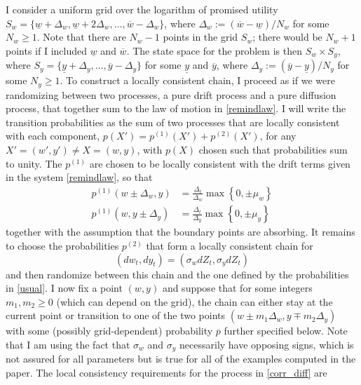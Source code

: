 \documentclass[11pt]{article}
\theoremstyle{plain}
\begin{document}

I consider a uniform grid over the logarithm of promised utility $S_w = \{\underline{w} + \Delta_w, \underline{w} + 2\Delta_w, \dots, \overline{w} - \Delta_w\}$, where $\Delta_w := (\overline{w} - \underline{w})/N_w$ for some $N_w \geq 1$. Note that there are $N_w-1$ points in the grid $S_w$; there would be $N_w+1$ points if I included $\underline{w}$ and $\overline{w}$.
The state space for the problem is then $S_w \times S_y$, where $S_y = \{\underline{y} + \Delta_y, \dots, \overline{y} - \Delta_y\}$ for some $\underline{y}$ and $\overline{y}$, where $\Delta_y := (\overline{y} - \underline{y})/N_y$ for some $N_y \geq 1$. To construct a locally consistent chain, I proceed as if we were randomizing between two processes, a pure drift process and a pure diffusion process, that together sum to the law of motion in \eqref{remindlaw}. I will write the transition probabilities as the sum of two processes that are locally consistent with each component, $p(X') = p^{(1)}(X') + p^{(2)}(X')$, for any $X' = (w',y') \neq X = (w,y)$, with $p(X)$ chosen such that probabilities sum to unity. The $p^{(1)}$ are chosen to be locally consistent with the drift terms given in the system \eqref{remindlaw}, so that
\begin{equation}
\begin{aligned} 
p^{(1)}(w \pm \Delta_w, y) & = \frac{\Delta_t}{\Delta_w} \max{\left\{0, \pm \mu_w \right\}}
\\ p^{(1)}(w, y \pm \Delta_y) & = \frac{\Delta_t}{\Delta_y} \max{\left\{0, \pm \mu_y \right\}}
\end{aligned}
\label{usual}
\end{equation} %
together with the assumption that the boundary points are absorbing. It remains to choose the probabilities $p^{(2)}$ that form a locally consistent chain for %
\begin{equation}
(dw_t, dy_t) = (\sigma_w dZ_t, \sigma_y dZ_t)
\label{corr_diff}
\end{equation} 
and then randomize between this chain and the one defined by the probabilities in \eqref{usual}. I now fix a point $(w, y)$ and suppose that for some integers $m_1, m_2 \geq 0$ (which can depend on the grid), the chain can either stay at the current point or transition to one of the two points $(w \pm m_1\Delta_w, y \mp m_2\Delta_y)$ with some (possibly grid-dependent) probability $\overline{p}$ further specified below. Note that I am using the fact that $\sigma_w$ and $\sigma_y$ necessarily have opposing signs, which is not assured for all parameters but is true for all of the examples computed in the paper. The local consistency requirements for the process in \eqref{corr_diff} are
\end{document}
